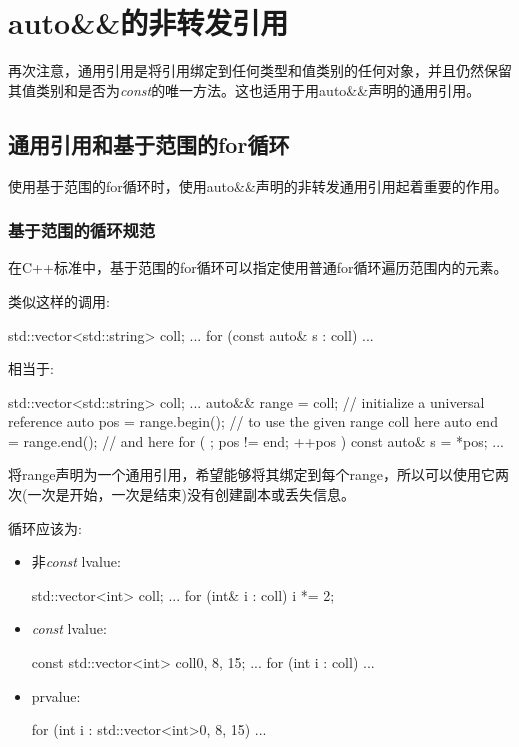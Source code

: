 \section{auto\&\&的非转发引用}
再次注意，通用引用是将引用绑定到任何类型和值类别的任何对象，并且仍然保留其值类别和是否为\textit{const}的唯一方法。这也适用于用auto\&\&声明的通用引用。

\subsection{通用引用和基于范围的for循环}

使用基于范围的for循环时，使用auto\&\&声明的非转发通用引用起着重要的作用。

\subsubsection{基于范围的循环规范}

在C++标准中，基于范围的for循环可以指定使用普通for循环遍历范围内的元素。

类似这样的调用:

\begin{cppcode}
std::vector<std::string> coll;
...
for (const auto& s : coll) {
	...
}
\end{cppcode}

相当于:

\begin{cppcode}
std::vector<std::string> coll;
...
auto&& range = coll; // initialize a universal reference
auto pos = range.begin(); // to use the given range coll here
auto end = range.end(); // and here
for ( ; pos != end; ++pos ) {
	const auto& s = *pos;
	...
}
\end{cppcode}

将range声明为一个通用引用，希望能够将其绑定到每个range，所以可以使用它两次(一次是开始，一次是结束)没有创建副本或丢失信息。

循环应该为:

\begin{itemize}
\item 非\textit{const} lvalue:
\begin{cppcode}
std::vector<int> coll;
...
for (int& i : coll) {
	i *= 2;
}
\end{cppcode}
\item \textit{const} lvalue:
\begin{cppcode}
const std::vector<int> coll{0, 8, 15};
...
for (int i : coll) {
	...
}
\end{cppcode}
\item prvalue:
\begin{cppcode}
for (int i : std::vector<int>{0, 8, 15}) {
	...
}
\end{cppcode}
\end{itemize}

